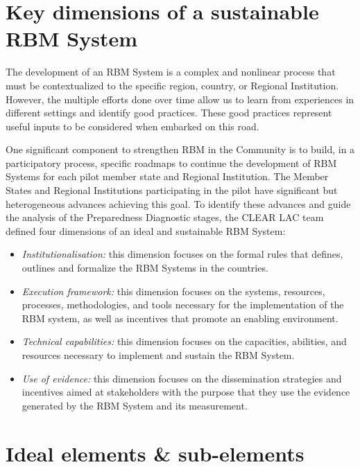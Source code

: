 \documentclass[
  10pt,
]{book}
\begin{document}
\hypertarget{key-dimensions-of-a-sustainable-rbm-system}{%
\section{Key dimensions of a sustainable RBM System}\label{key-dimensions-of-a-sustainable-rbm-system}}

The development of an RBM System is a complex and nonlinear process that must be contextualized to the specific region, country, or Regional Institution. However, the multiple efforts done over time allow us to learn from experiences in different settings and identify good practices. These good practices represent useful inputs to be considered when embarked on this road.

One significant component to strengthen RBM in the Community is to build, in a participatory process, specific roadmaps to continue the development of RBM Systems for each pilot member state and Regional Institution. The Member States and Regional Institutions participating in the pilot have significant but heterogeneous advances achieving this goal. To identify these advances and guide the analysis of the Preparedness Diagnostic stages, the CLEAR LAC team defined four dimensions of an ideal and sustainable RBM System:

\begin{itemize}
\item
  \emph{Institutionalisation:} this dimension focuses on the formal rules that defines, outlines and formalize the RBM Systems in the countries.
\item
  \emph{Execution framework:} this dimension focuses on the systems, resources, processes, methodologies, and tools necessary for the implementation of the RBM system, as well as incentives that promote an enabling environment.
\item
  \emph{Technical capabilities:} this dimension focuses on the capacities, abilities, and resources necessary to implement and sustain the RBM System.
\item
  \emph{Use of evidence:} this dimension focuses on the dissemination strategies and incentives aimed at stakeholders with the purpose that they use the evidence generated by the RBM System and its measurement.
\end{itemize}

\hypertarget{ideal-elements-sub-elements}{%
\section{Ideal elements \& sub-elements}\label{ideal-elements-sub-elements}}
\end{document}
